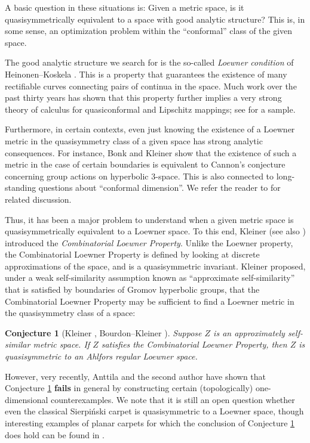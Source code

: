\documentclass{amsart}
\theoremstyle{plain}
\newtheorem{conjecture}[theorem]{Conjecture}
\theoremstyle{definition}
\numberwithin{equation}{section}
\numberwithin{theorem}{section}
\begin{document}
A basic question in these situations is: Given a metric space, is it quasisymmetrically equivalent to a space with good analytic structure? This is, in some sense, an optimization problem within the ``conformal'' class of the given space.

The good analytic structure we search for is the so-called \emph{Loewner condition} of Heinonen--Koskela \cite{HK}. This is a property that guarantees the existence of many rectifiable curves connecting pairs of continua in the space. Much work over the past thirty years has shown that this property further implies a very strong theory of calculus for quasiconformal and Lipschitz mappings; see \cite{HK, Ch, HajlaszKoskela, BateLi, HKST} for a sample.

Furthermore, in certain contexts, even just knowing the existence of a Loewner metric in the  quasisymmetry class of a given space has strong analytic consequences. For instance, Bonk and Kleiner \cite{BK04} show that the existence of such a metric in the case of certain boundaries is equivalent to Cannon's conjecture concerning group actions on hyperbolic $3$-space. This is also connected to long-standing questions about ``conformal dimension''. We refer the reader to \cite{KleinerICM, BonkICM, MT,CS, AEBa} for related discussion.

Thus, it has been a major problem to understand when a given metric space is quasisymmetrically equivalent to a Loewner space. To this end, Kleiner \cite{KleinerICM} (see also \cite{BourK}) introduced the \emph{Combinatorial Loewner Property}. Unlike the Loewner property, the Combinatorial Loewner Property is defined by looking at discrete approximations of the space, and is a quasisymmetric invariant. Kleiner proposed, under a weak self-similarity assumption known as ``approximate self-similarity'' that is satisfied by boundaries of Gromov hyperbolic groups, that the Combinatorial Loewner Property may be sufficient to find a Loewner metric in the quasisymmetry class of a space:

\begin{conjecture}[Kleiner \cite{KleinerICM}, Bourdon--Kleiner \cite{BourK}]\label{conj:Kleiner}
Suppose $Z$ is an approximately self-similar metric space. If $Z$ satisfies the Combinatorial Loewner Property, then $Z$ is quasisymmetric to an Ahlfors regular Loewner space.
\end{conjecture}

However, very recently, Anttila and the second author \cite{AEBa} have shown that Conjecture \ref{conj:Kleiner} \textbf{fails} in general by constructing certain (topologically) one-dimensional counterexamples. We note that it is still an open question whether even the classical Sierpi\'nski carpet is quasisymmetric to a Loewner space, though interesting examples of planar carpets for which the conclusion of Conjecture \ref{conj:Kleiner} does hold can be found in \cite{CS}.
\end{document}
